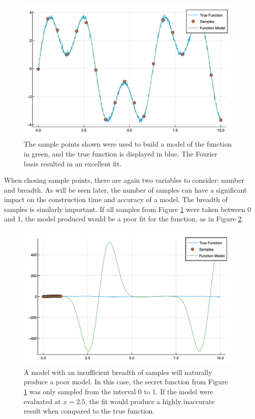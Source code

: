 \begin{figure}[h]
\includegraphics[scale = 0.27]{Figures/2dFourier}
\caption{The sample points shown were used to build a model of the function in green, and the true function is displayed in blue. The Fourier basis resulted in an excellent fit. 
\label{fig:2dFourier}} 
\end{figure}

\par When chosing sample points, there are again two variables to consider: number and breadth. As will be seen later, the number of samples can have a significant impact on the construction time and accuracy of a model. The breadth of samples is similarly important. If all samples from Figure \ref{fig:2dFourier} were taken between 0 and 1, the model produced would be a poor fit for the function, as in Figure \ref{fig:poorSamps}. 

\begin{figure}[h]
\includegraphics[scale = 0.4]{Figures/poorSamps}
\caption{A model with an insufficient breadth of samples will naturally produce a poor model. In this case, the secret function from Figure \ref{fig:2dFourier} was only sampled from the interval 0 to 1. If the model were evaluated at $x=2.5$, the fit would produce a highly inaccurate result when compared to the true function.
\label{fig:poorSamps}} 
\end{figure}

